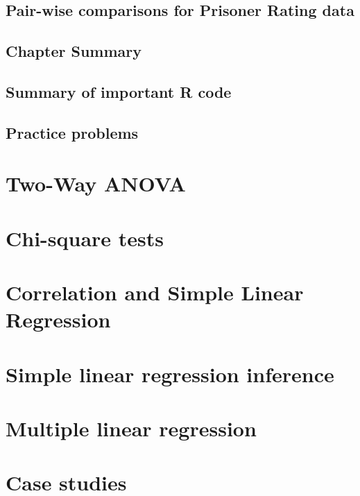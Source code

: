 \documentclass[]{book}
\begin{document}
\section{Pair-wise comparisons for Prisoner Rating
data}\label{section3-7}

\section{Chapter Summary}\label{section3-8}

\section{Summary of important R code}\label{section3-9}

\section{Practice problems}\label{section3-10}

\chapter{Two-Way ANOVA}\label{chapter4}

\chapter{Chi-square tests}\label{chapter5}

\chapter{Correlation and Simple Linear Regression}\label{chapter6}

\chapter{Simple linear regression inference}\label{chapter7}

\chapter{Multiple linear regression}\label{chapter8}

\chapter{Case studies}\label{chapter9}


\end{document}
